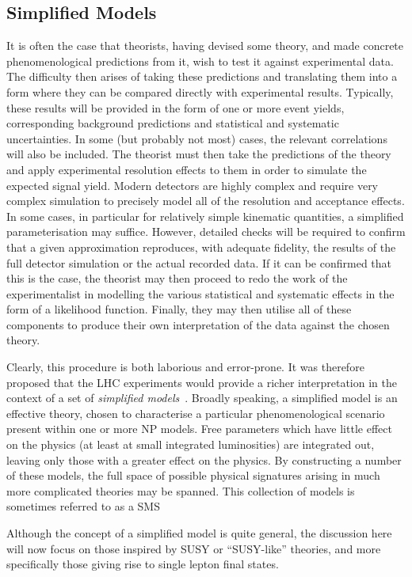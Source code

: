 \subsection{Simplified Models}
\label{sec:sms}
It is often the case that theorists, having devised some theory, and made
concrete phenomenological predictions from it, wish to test it against
experimental data. The difficulty then arises of taking these predictions and
translating them into a form where they can be compared directly with
experimental results. Typically, these results will be provided in the form of
one or more event yields, corresponding background predictions and statistical
and systematic uncertainties. In some (but probably not most) cases, the
relevant correlations will also be included. The theorist must then take the
predictions of the theory and apply experimental resolution effects to them in
order to simulate the expected signal yield. Modern detectors are highly complex
and require very complex simulation to precisely model all of the resolution and
acceptance effects. In some cases, in particular for relatively simple kinematic
quantities, a simplified parameterisation may suffice. However, detailed checks
will be required to confirm that a given approximation reproduces, with adequate
fidelity, the results of the full detector simulation or the actual recorded
data. If it can be confirmed that this is the case, the theorist may then
proceed to redo the work of the experimentalist in modelling the various
statistical and systematic effects in the form of a likelihood
function. Finally, they may then utilise all of these components to produce
their own interpretation of the data against the chosen theory.

Clearly, this procedure is both laborious and error-prone. It was therefore
proposed that the \ac{LHC} experiments would provide a richer interpretation in
the context of a set of \emph{simplified models}~\cite{alwall_simplified}. Broadly
speaking, a simplified model is an effective theory, chosen to characterise a
particular phenomenological scenario present within one or more \ac{NP}
models. Free parameters which have little effect on the physics (at least at
small integrated luminosities) are integrated out, leaving only those with a
greater effect on the physics. By constructing a number of these models, the
full space of possible physical signatures arising in much more complicated
theories may be spanned. This collection of models is sometimes referred to as a
\acf{SMS}

Although the concept of a simplified model is quite general, the discussion here
will now focus on those inspired by \ac{SUSY} or ``\ac{SUSY}-like'' theories,
and more specifically those giving rise to single lepton final states.


